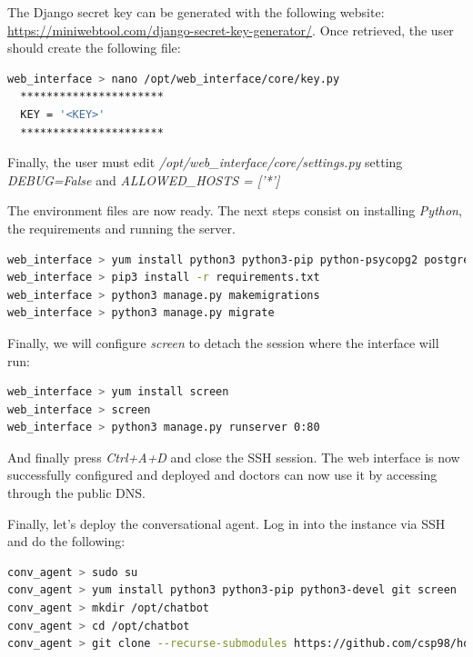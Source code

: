 \documentclass[12pt,english]{article}
\begin{document}
The Django secret key can be generated with the following website: \\\href{https://miniwebtool.com/django-secret-key-generator/}{https://miniwebtool.com/django-secret-key-generator/}. Once retrieved, the user should create the following file:

\begin{lstlisting}[mathescape=false, language=bash, caption={Command to create Django key file and key.py file contents}, captionpos=b]
  web_interface > nano /opt/web_interface/core/key.py
  **********************
  KEY = '<KEY>'
  **********************
\end{lstlisting}

Finally, the user must edit \emph{/opt/web\_interface/core/settings.py} setting \emph{DEBUG=False} and \emph{ALLOWED\_HOSTS = ['*']}

The environment files are now ready. The next steps consist on installing \emph{Python}, the requirements and running the server.

\begin{lstlisting}[mathescape=false, language=bash, caption={Commands to install Python and its requirements}, captionpos=b]
web_interface > yum install python3 python3-pip python-psycopg2 postgresql gcc python3-devel
web_interface > pip3 install -r requirements.txt
web_interface > python3 manage.py makemigrations
web_interface > python3 manage.py migrate
\end{lstlisting}

Finally, we will configure \emph{screen} to detach the session where the interface will run:

\begin{lstlisting}[mathescape=false, language=bash, caption={Commands to detatch the session and run the web interface server}, captionpos=b]
web_interface > yum install screen
web_interface > screen
web_interface > python3 manage.py runserver 0:80
\end{lstlisting}

And finally press \emph{Ctrl+A+D} and close the SSH session. The web interface is now successfully configured and deployed and doctors can now use it by accessing through the public DNS.

Finally, let's deploy the conversational agent. Log in into the instance via SSH and do the following:

\begin{lstlisting}[mathescape=false, language=bash, caption={Commands to download HOW-R-U chatbot module and install its dependencies}, captionpos=b]
conv_agent > sudo su
conv_agent > yum install python3 python3-pip python3-devel git screen
conv_agent > mkdir /opt/chatbot
conv_agent > cd /opt/chatbot
conv_agent > git clone --recurse-submodules https://github.com/csp98/howru_chatbot.git .
\end{lstlisting}
\end{document}
